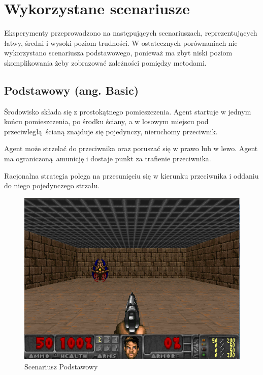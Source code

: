 \section{Wykorzystane scenariusze}
Eksperymenty przeprowadzono na następujących scenariuszach, reprezentujących łatwy, średni i wysoki poziom trudności. W ostatecznych porównaniach nie wykorzystano scenariusza podstawowego, ponieważ ma zbyt niski poziom skomplikowania żeby zobrazować zależności pomiędzy metodami.

\subsection{Podstawowy (ang. Basic)}\label{scenario_basic}
Środowisko składa się z prostokątnego pomieszczenia. Agent startuje w jednym końcu pomieszczenia, po środku ściany, a w losowym miejscu pod przeciwległą ścianą znajduje się pojedynczy, nieruchomy przeciwnik.

Agent może strzelać do przeciwnika oraz poruszać się w prawo lub w lewo. Agent ma ograniczoną amunicję i dostaje punkt za trafienie przeciwnika.

Racjonalna strategia polega na przesunięciu się w kierunku przeciwnika i oddaniu do niego pojedynczego strzału.

\begin{center}
\begin{figure}[H]
\includegraphics[scale = 0.4]{figures/screens/scenarios/basic.png}{\caption{Scenariusz Podstawowy}\label{fig:scenario_basic}}
\end{figure}
\end{center}
